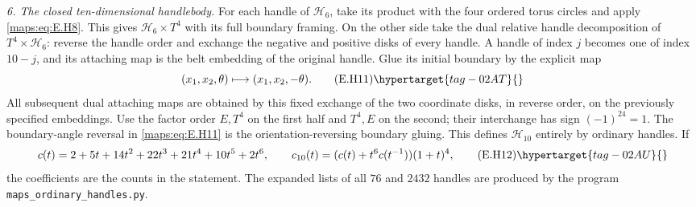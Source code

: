 \begin{theorem}
\emph{6. The closed ten-dimensional handlebody.}
For each handle of $\mathcal H_6$, take its product with the four
ordered torus circles and apply \eqref{maps:eq:E.H8}.  This gives
$\mathcal H_6\times T^4$ with its full boundary framing.  On the
other side take the dual relative handle decomposition of
$T^4\times\mathcal H_6$: reverse the handle order and exchange
the negative and positive disks of every handle.  A handle of
index $j$ becomes one of index $10-j$, and its attaching map is
the belt embedding of the original handle.  Glue its
initial boundary by the explicit map
\[
                 (x_1,x_2,\theta)\longmapsto
                                    (x_1,x_2,-\theta).
 \tag{E.H11}\hypertarget{tag-02AT}{}\label{maps:eq:E.H11}
\]
All subsequent dual attaching maps are obtained by this fixed
exchange of the two coordinate disks, in reverse order, on the
previously specified embeddings.  Use the factor order $E,T^4$
on the first half and $T^4,E$ on the second; their interchange
has sign $(-1)^{24}=1$.  The boundary-angle reversal in \eqref{maps:eq:E.H11}
is the orientation-reversing boundary gluing.  This defines
$\mathcal H_{10}$ entirely by ordinary handles.  If
\[
 c(t)=2+5t+14t^2+22t^3+21t^4+10t^5+2t^6,
 \qquad
       c_{10}(t)=(c(t)+t^6c(t^{-1}))(1+t)^4,
 \tag{E.H12}\hypertarget{tag-02AU}{}\label{maps:eq:E.H12}
\]
the coefficients are the counts in the statement.  The expanded lists of all $76$ and $2432$ handles are produced by the program \texttt{maps\_ordinary\_handles.py}.

\end{theorem}



